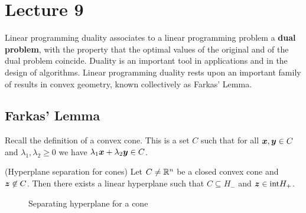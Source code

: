 %
%
% 


\chapter*{Lecture 9}
\addtocounter{chapter}{9}
\addtocounter{section}{0}


Linear programming duality associates to a linear programming problem a \textbf{dual problem}, with the property that the optimal values of the original and of the dual problem coincide. Duality is an important tool in applications and in the design of algorithms. Linear programming duality rests upon an important family of results in convex geometry, known collectively as Farkas' Lemma.

\section{Farkas' Lemma}

Recall the definition of a convex cone. This is a set $C$ such that for all $\bm{x},\bm{y}\in C$ and $\lambda_1,\lambda_2\geq 0$ we have $\lambda_1\bm{x}+\lambda_2\bm{y}\in C$. 

\begin{lemma}(Hyperplane separation for cones)\label{le:hypcone}
 Let $C\neq \mathbb{R}^n$ be a closed convex cone and $\bm{z}\not\in C$. Then there exists a linear hyperplane such that $C\subseteq H_-$ and $\bm{z}\in {\operatorname{int}} H_+$.
\end{lemma}

\begin{figure}[h!]
\centering
{}
\caption{Separating hyperplane for a cone} \label{fig:sepcone}
\end{figure}


